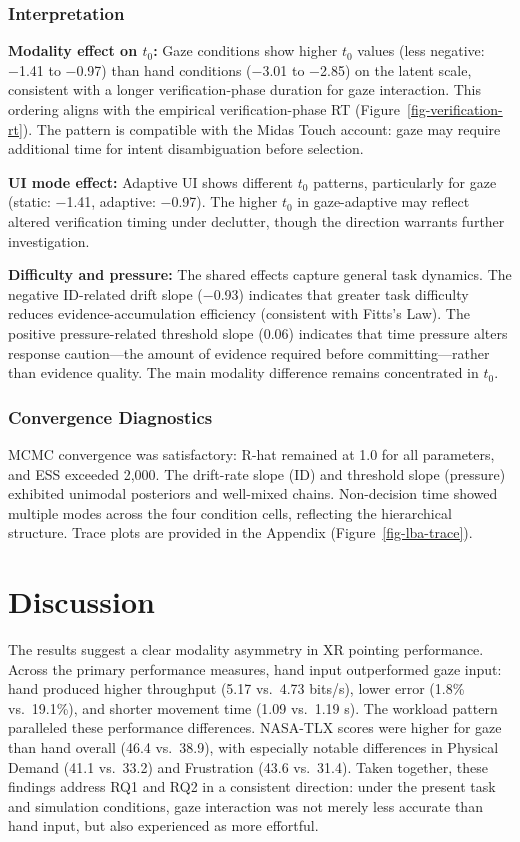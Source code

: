 \documentclass[
  11pt,
  11pt,
  letterpaper]{article}
\begin{document}
\subsubsection{Interpretation}\label{interpretation}

\textbf{Modality effect on \(t_0\):} Gaze conditions show higher \(t_0\)
values (less negative: −1.41 to −0.97) than hand conditions (−3.01 to
−2.85) on the latent scale, consistent with a longer verification-phase
duration for gaze interaction. This ordering aligns with the empirical
verification-phase RT (Figure~\ref{fig-verification-rt}). The pattern is
compatible with the Midas Touch account: gaze may require additional
time for intent disambiguation before selection.

\textbf{UI mode effect:} Adaptive UI shows different \(t_0\) patterns,
particularly for gaze (static: −1.41, adaptive: −0.97). The higher
\(t_0\) in gaze-adaptive may reflect altered verification timing under
declutter, though the direction warrants further investigation.

\textbf{Difficulty and pressure:} The shared effects capture general
task dynamics. The negative ID-related drift slope (−0.93) indicates
that greater task difficulty reduces evidence-accumulation efficiency
(consistent with Fitts's Law). The positive pressure-related threshold
slope (0.06) indicates that time pressure alters response caution---the
amount of evidence required before committing---rather than evidence
quality. The main modality difference remains concentrated in \(t_0\).

\subsubsection{Convergence Diagnostics}\label{convergence-diagnostics}

MCMC convergence was satisfactory: R-hat remained at 1.0 for all
parameters, and ESS exceeded 2,000. The drift-rate slope (ID) and
threshold slope (pressure) exhibited unimodal posteriors and well-mixed
chains. Non-decision time showed multiple modes across the four
condition cells, reflecting the hierarchical structure. Trace plots are
provided in the Appendix (Figure~\ref{fig-lba-trace}).

\section{Discussion}\label{discussion}

The results suggest a clear modality asymmetry in XR pointing
performance. Across the primary performance measures, hand input
outperformed gaze input: hand produced higher throughput (5.17 vs.~4.73
bits/s), lower error (1.8\% vs.~19.1\%), and shorter movement time (1.09
vs.~1.19 s). The workload pattern paralleled these performance
differences. NASA-TLX scores were higher for gaze than hand overall
(46.4 vs.~38.9), with especially notable differences in Physical Demand
(41.1 vs.~33.2) and Frustration (43.6 vs.~31.4). Taken together, these
findings address RQ1 and RQ2 in a consistent direction: under the
present task and simulation conditions, gaze interaction was not merely
less accurate than hand input, but also experienced as more effortful.
\end{document}
